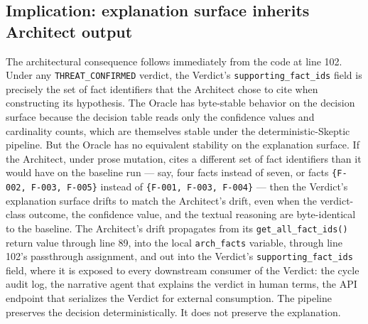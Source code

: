 \documentclass[sigconf,anonymous,review,nonacm=false]{acmart}
\begin{document}
\subsection{Implication: explanation surface inherits Architect output}
The architectural consequence follows immediately from the code at line 102. Under any \texttt{THREAT\_CONFIRMED} verdict, the Verdict's \texttt{supporting\_fact\_ids} field is precisely the set of fact identifiers that the Architect chose to cite when constructing its hypothesis. The Oracle has byte-stable behavior on the decision surface because the decision table reads only the confidence values and cardinality counts, which are themselves stable under the deterministic-Skeptic pipeline. But the Oracle has no equivalent stability on the explanation surface. If the Architect, under prose mutation, cites a different set of fact identifiers than it would have on the baseline run — say, four facts instead of seven, or facts \texttt{\{F-002, F-003, F-005\}} instead of \texttt{\{F-001, F-003, F-004\}} — then the Verdict's explanation surface drifts to match the Architect's drift, even when the verdict-class outcome, the confidence value, and the textual reasoning are byte-identical to the baseline. The Architect's drift propagates from its \texttt{get\_all\_fact\_ids()} return value through line 89, into the local \texttt{arch\_facts} variable, through line 102's passthrough assignment, and out into the Verdict's \texttt{supporting\_fact\_ids} field, where it is exposed to every downstream consumer of the Verdict: the cycle audit log, the narrative agent that explains the verdict in human terms, the API endpoint that serializes the Verdict for external consumption. The pipeline preserves the decision deterministically. It does not preserve the explanation.
\end{document}
